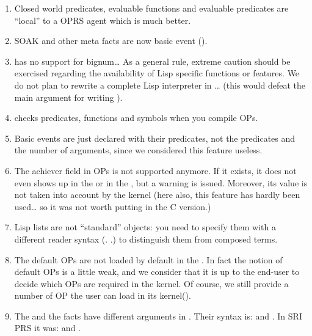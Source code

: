 \begin{enumerate}
\item Closed world predicates, evaluable functions and evaluable predicates
are ``local'' to a OPRS agent which is much better.

\item SOAK and other meta facts are now basic event ().

\item \COPRS{} has no support for bignum\dots{} As a general rule, extreme
caution should be exercised regarding the availability of Lisp specific
functions or features. We do not plan to rewrite a complete Lisp
interpreter in \COPRS{}\dots{} (this would defeat the main argument for
writing \COPRS{}).

\item \COPRS{} checks predicates, functions and symbols when you compile
OPs.

\item Basic events are just declared with their predicates, not the
predicates and the number of arguments, since we considered this feature
useless.

\item The achiever field in OPs is not supported anymore. If it exists, it
does not even shows up in the \OPE{} or in the \XPK, but a warning is
issued. Moreover, its value is not taken into account by the kernel (here
also, this feature has hardly been used\dots{} so it was not worth putting
in the C version.)

\item Lisp lists are not ``standard'' objects: you need to specify them
with a different reader syntax (. .) to distinguish them from composed
terms.

\item The default OPs are not loaded by default in the \CPK{}. In
fact the notion of default OPs is a little weak, and we consider that it
is up to the end-user to decide which OPs are required in the kernel. Of
course, we still provide a number of OP the user can load in its
kernel().

\item The  and the 
facts have different arguments in \CPK{}. Their syntax is: \*
 \*
and \*
. \*
In SRI PRS it was: \*
 \*
and \*
.


\end{enumerate}
